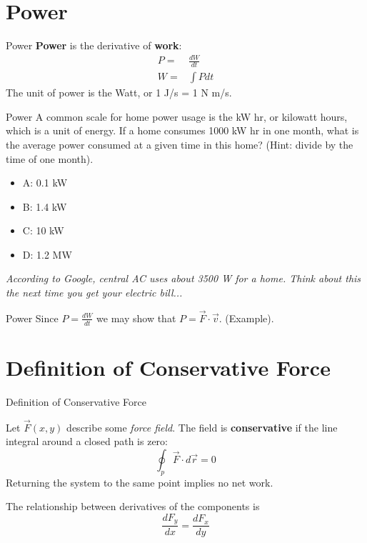\documentclass{beamer}
\begin{document}
\section{Power}

\begin{frame}{Power}
\textbf{Power} is the derivative of \textbf{work}:
\begin{align}
P =& \frac{dW}{dt} \\
W =& \int P dt
\end{align}
The unit of power is the Watt, or 1 J/s = 1 N m/s.
\end{frame}

\begin{frame}{Power}
A common scale for home power usage is the kW hr, or kilowatt hours, which is a unit of energy.  If a home consumes 1000 kW hr in one month, what is the average power consumed at a given time in this home?  (Hint: divide by the time of one month).
\begin{itemize}
\item A: 0.1 kW
\item B: 1.4 kW
\item C: 10 kW
\item D: 1.2 MW
\end{itemize}
\textit{According to Google, central AC uses about 3500 W for a home.  Think about this the next time you get your electric bill...}
\end{frame}

\begin{frame}{Power}
Since $P = \frac{dW}{dt}$ we may show that $P = \vec{F} \cdot \vec{v}$.  (Example).
\end{frame}

\section{Definition of Conservative Force}

\begin{frame}{Definition of Conservative Force}
\small
\begin{tcolorbox}[colback=white,colframe=red!40!blue,title=Definition of Conservative Force]
\alert{Let $\vec{F}(x,y)$ describe some \textit{force field}.  The field is \textbf{conservative} if the line integral around a closed path is zero: \\
\begin{equation}
\oint_{p} \vec{F} \cdot d\vec{r} = 0
\end{equation}
Returning the system to the same point implies no net work.}
\end{tcolorbox}
\begin{tcolorbox}[colback=white,colframe=red!40!blue,title=Corollary 1]
The relationship between derivatives of the components is
\begin{equation}
\frac{dF_y}{dx} = \frac{dF_x}{dy}
\end{equation}
\end{tcolorbox}
\end{frame}
\end{document}
